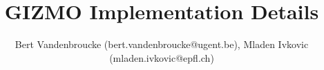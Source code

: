 




\title{GIZMO Implementation Details}
\author{Bert Vandenbroucke (bert.vandenbroucke@ugent.be), Mladen Ivkovic (mladen.ivkovic@epfl.ch)}
\date{}







\newcommand{\Aij}{$\mathbf{A}_{ij}$}
\newcommand{\Aijm}{\mathbf{A}_{ij}}		%
\newcommand{\U}{\mathbf{U}}
\newcommand{\F}{\mathbf{F}}
\newcommand{\psitilde}{\tilde{\boldsymbol{\psi}}}






	



\maketitle





























\printbibliography







